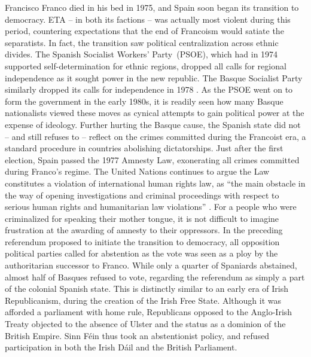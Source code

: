 \documentclass[basque,american]{../../../coursework}
\begin{document}
Francisco Franco died in his bed in 1975, and Spain soon began its transition
to democracy. ETA -- in both its factions -- was actually most violent during
this period, countering expectations that the end of Francoism would satiate
the separatists. In fact, the transition saw political centralization across
ethnic divides. The Spanish Socialist Workers' Party~(PSOE), which had in 1974
supported self-determination for ethnic regions, dropped all calls for
regional independence as it sought power in the new republic. The Basque
Socialist Party similarly dropped its calls for independence in 1978
\parencite[47]{Whitfield2014}. As the PSOE went on to form the government in
the early 1980s, it is readily seen how many Basque nationalists viewed these
moves as cynical attempts to gain political power at the expense of ideology.
Further hurting the Basque cause, the Spanish state did not -- and still
refuses to -- reflect on the crimes committed during the Francoist era, a
standard procedure in countries abolishing dictatorships. Just after the first
election, Spain passed the 1977 Amnesty Law, exonerating all crimes committed
during Franco's regime. The United Nations continues to argue the Law
constitutes a violation of international human rights law, as \enquote{the
main obstacle in the way of opening investigations and criminal proceedings
with respect to serious human rights and humanitarian law violations}
\parencite{Greiff2014}. For a people who were criminalized for speaking
their mother tongue, it is not difficult to imagine frustration at the
awarding of amnesty to their oppressors. In the preceding referendum proposed
to initiate the transition to democracy, all opposition political parties
called for abstention as the vote was seen as a ploy by the authoritarian
successor to Franco. While only a quarter of Spaniards abstained, almost half
of Basques refused to vote, regarding the referendum as simply a part of the
colonial Spanish state. This is distinctly similar to an early era of Irish
Republicanism, during the creation of the Irish Free State. Although it was
afforded a parliament with home rule, Republicans opposed to the Anglo-Irish
Treaty objected to the absence of Ulster and the status as a dominion of the
British Empire. Sinn Féin thus took an abstentionist policy, and refused
participation in both the Irish Dáil and the British Parliament.
\end{document}

